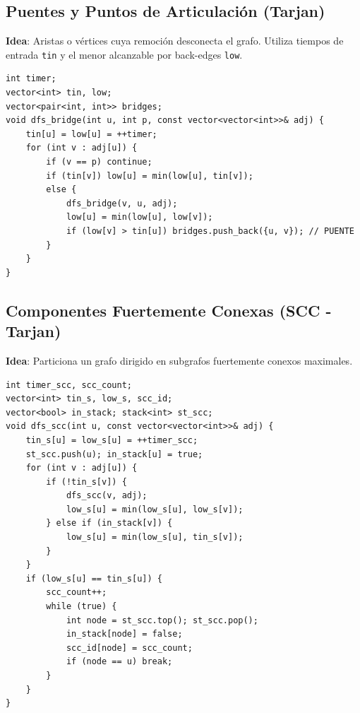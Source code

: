 \documentclass[9pt,twocolumn,a4paper]{extarticle}
\begin{document}
\subsection{Puentes y Puntos de Articulación (Tarjan)}
\textbf{Idea}: Aristas o vértices cuya remoción desconecta el grafo. Utiliza tiempos de entrada \texttt{tin} y el menor alcanzable por back-edges \texttt{low}.
\begin{lstlisting}
int timer;
vector<int> tin, low;
vector<pair<int, int>> bridges;
void dfs_bridge(int u, int p, const vector<vector<int>>& adj) {
    tin[u] = low[u] = ++timer;
    for (int v : adj[u]) {
        if (v == p) continue;
        if (tin[v]) low[u] = min(low[u], tin[v]);
        else {
            dfs_bridge(v, u, adj);
            low[u] = min(low[u], low[v]);
            if (low[v] > tin[u]) bridges.push_back({u, v}); // PUENTE
        }
    }
}
\end{lstlisting}

\subsection{Componentes Fuertemente Conexas (SCC - Tarjan)}
\textbf{Idea}: Particiona un grafo dirigido en subgrafos fuertemente conexos maximales.
\begin{lstlisting}
int timer_scc, scc_count;
vector<int> tin_s, low_s, scc_id;
vector<bool> in_stack; stack<int> st_scc;
void dfs_scc(int u, const vector<vector<int>>& adj) {
    tin_s[u] = low_s[u] = ++timer_scc;
    st_scc.push(u); in_stack[u] = true;
    for (int v : adj[u]) {
        if (!tin_s[v]) {
            dfs_scc(v, adj);
            low_s[u] = min(low_s[u], low_s[v]);
        } else if (in_stack[v]) {
            low_s[u] = min(low_s[u], tin_s[v]);
        }
    }
    if (low_s[u] == tin_s[u]) {
        scc_count++;
        while (true) {
            int node = st_scc.top(); st_scc.pop();
            in_stack[node] = false;
            scc_id[node] = scc_count;
            if (node == u) break;
        }
    }
}
\end{lstlisting}
\end{document}
